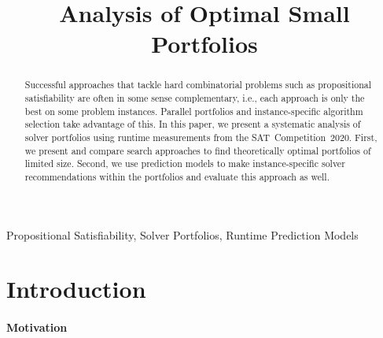 \documentclass[conference]{IEEEtran}
\begin{document}
\title{Analysis of Optimal Small Portfolios}

\author{
\and
{}
}

\maketitle

\begin{abstract}
Successful approaches that tackle hard combinatorial problems such as propositional satisfiability are often in some sense complementary, i.e., each approach is only the best on some problem instances.
Parallel portfolios and instance-specific algorithm selection take advantage of this.
In this paper, we present a systematic analysis of solver portfolios using runtime measurements from the SAT~Competition~2020.
First, we present and compare search approaches to find theoretically optimal portfolios of limited size.
Second, we use prediction models to make instance-specific solver recommendations within the portfolios and evaluate this approach as well.
\end{abstract}

\begin{IEEEkeywords}
Propositional Satisfiability, Solver Portfolios, Runtime Prediction Models
\end{IEEEkeywords}

\section{Introduction}
\label{sec:introduction}

\paragraph{Motivation}
\end{document}
